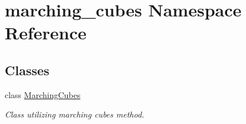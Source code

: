 \hypertarget{namespacemarching__cubes}{}\section{marching\+\_\+cubes Namespace Reference}
\label{namespacemarching__cubes}
\subsection*{Classes}
\begin{DoxyCompactItemize}
\item 
class \hyperlink{classmarching__cubes_1_1_marching_cubes}{Marching\+Cubes}
\begin{DoxyCompactList}\small\item\em Class utilizing marching cubes method. \end{DoxyCompactList}\end{DoxyCompactItemize}
